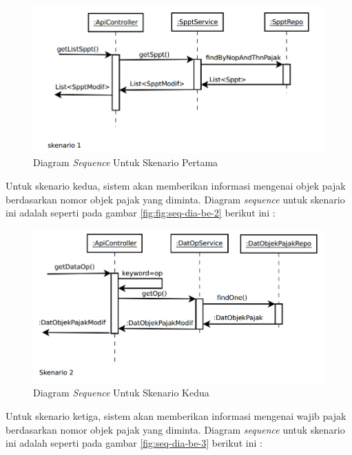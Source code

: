 \begin{figure}[H]
	\centering
	\includegraphics[width=1\textwidth]{./resources/uml/seq-dia-1}
	\caption{Diagram \textit{Sequence} Untuk Skenario Pertama}
	\label{fig:seq-dia-be-1}
\end{figure}

Untuk skenario kedua, sistem akan memberikan informasi mengenai objek pajak berdasarkan nomor objek pajak yang diminta. Diagram \textit{sequence} untuk skenario ini adalah seperti pada gambar \ref{fig:fig:seq-dia-be-2} berikut ini :

\begin{figure}[H]
	\centering
	\includegraphics[width=1\textwidth]{./resources/uml/seq-dia-2}
	\caption{Diagram \textit{Sequence} Untuk Skenario Kedua}
	\label{fig:seq-dia-be-2}
\end{figure}

Untuk skenario ketiga, sistem akan memberikan informasi mengenai wajib pajak berdasarkan nomor objek pajak yang diminta. Diagram \textit{sequence} untuk skenario ini adalah seperti pada gambar \ref{fig:seq-dia-be-3} berikut ini :

